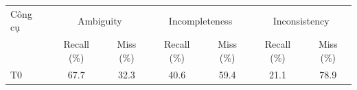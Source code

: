 \begin{tabular}{lcccccc}
\toprule
Công cụ & \multicolumn{2}{c}{Ambiguity} & \multicolumn{2}{c}{Incompleteness} & \multicolumn{2}{c}{Inconsistency} \\
 & Recall (\%) & Miss (\%) & Recall (\%) & Miss (\%) & Recall (\%) & Miss (\%) \\
\midrule
T0 & 67.7 & 32.3 & 40.6 & 59.4 & 21.1 & 78.9 \\
\bottomrule
\end{tabular}
